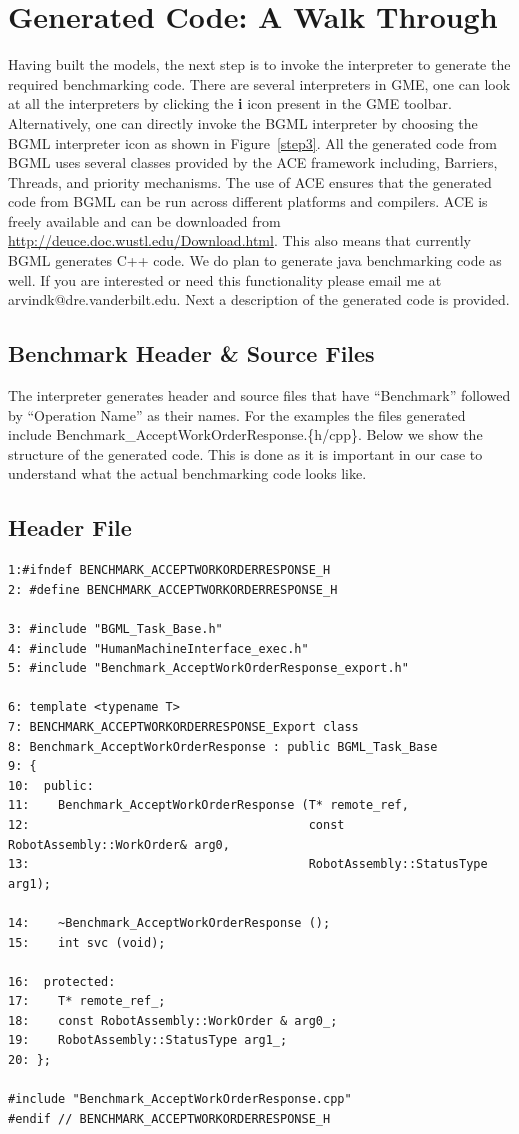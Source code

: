 \documentclass[onecolumn]{article}
\begin{document}
\section* {Generated Code: A Walk Through}
Having built the models, the next step is to invoke the interpreter to
generate the required benchmarking code. There are several
interpreters in GME, one can look at all the interpreters by clicking
the {\bf i} icon present in the GME toolbar. Alternatively, one can
directly invoke the BGML interpreter by choosing the BGML interpreter
icon as shown in Figure~\ref{step3}. All the generated code from BGML
uses several classes provided by the ACE framework including,
Barriers, Threads, and priority mechanisms. The use of ACE ensures
that the generated code from BGML can be run across different
platforms and compilers. ACE is freely available and can be downloaded
from \url{http://deuce.doc.wustl.edu/Download.html}. This also means
that currently BGML generates C++ code. We do plan to generate java
benchmarking code as well. If you are interested or need this
functionality please email me at arvindk@dre.vanderbilt.edu. Next
a description of the generated code is provided.

\subsection* {Benchmark Header \& Source Files}
The interpreter generates header and source files that have
``Benchmark'' followed by ``Operation Name'' as their names. For the
examples the files generated include
Benchmark\_AcceptWorkOrder\-Response.\{h/cpp\}. Below we show the structure
of the generated code. This is done as it is important in our case to
understand what the actual benchmarking code looks like.

\subsection* {Header File}
{
\footnotesize
\begin{verbatim}
1:#ifndef BENCHMARK_ACCEPTWORKORDERRESPONSE_H
2: #define BENCHMARK_ACCEPTWORKORDERRESPONSE_H

3: #include "BGML_Task_Base.h"
4: #include "HumanMachineInterface_exec.h"
5: #include "Benchmark_AcceptWorkOrderResponse_export.h"

6: template <typename T>
7: BENCHMARK_ACCEPTWORKORDERRESPONSE_Export class
8: Benchmark_AcceptWorkOrderResponse : public BGML_Task_Base
9: {
10:  public:
11:    Benchmark_AcceptWorkOrderResponse (T* remote_ref,
12:                                       const RobotAssembly::WorkOrder& arg0,
13:                                       RobotAssembly::StatusType arg1);

14:    ~Benchmark_AcceptWorkOrderResponse ();
15:    int svc (void);

16:  protected:
17:    T* remote_ref_;
18:    const RobotAssembly::WorkOrder & arg0_;
19:    RobotAssembly::StatusType arg1_;
20: };

#include "Benchmark_AcceptWorkOrderResponse.cpp"
#endif // BENCHMARK_ACCEPTWORKORDERRESPONSE_H
\end{verbatim}
}
\normalsize
\end{document}
